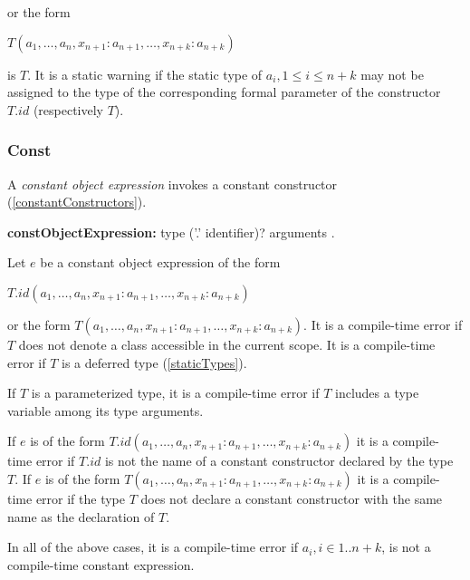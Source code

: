 \documentclass{article}
\begin{document}
or the form

\NEW{} $T(a_1, \ldots , a_n, x_{n+1}: a_{n+1}, \ldots , x_{n+k}: a_{n+k})$

is $T$.
It is a static warning if the static type of $a_i, 1 \le i \le n+ k$ may not be assigned to the type of the corresponding formal parameter of the constructor $T.id$ (respectively $T$).


\subsubsection{Const}

\LMHash{}
A {\em constant object expression} invokes a constant constructor (\ref{constantConstructors}).

\begin{grammar}
{\bf constObjectExpression:}\CONST{} type ('{\escapegrammar .}' identifier)? arguments
  .
\end{grammar}

\LMHash{}
Let $e$ be a constant object expression of the form

\CONST{} $T.id(a_1, \ldots , a_n, x_{n+1}: a_{n+1}, \ldots , x_{n+k}: a_{n+k})$

or the form \CONST{} $T(a_1, \ldots , a_n, x_{n+1}: a_{n+1}, \ldots , x_{n+k}: a_{n+k})$.
It is a compile-time error if $T$ does not denote a class accessible in the current scope.
It is a compile-time error if $T$ is a deferred type (\ref{staticTypes}).


\LMHash{}
If $T$ is a parameterized type, it is a compile-time error if $T$ includes a type variable among its type arguments.

\LMHash{}
If $e$ is of the form \CONST{} $T.id(a_1, \ldots , a_n, x_{n+1}: a_{n+1}, \ldots , x_{n+k}: a_{n+k})$ it is a compile-time error if $T.id$ is not the name of a constant constructor declared by the type $T$.
If $e$ is of the form \CONST{} $T(a_1, \ldots , a_n, x_{n+1}: a_{n+1}, \ldots , x_{n+k}: a_{n+k})$ it is a compile-time error if the type $T$ does not declare a constant constructor with the same name as the declaration of $T$.

\LMHash{}
In all of the above cases, it is a compile-time error if $a_i, i\in 1 .. n + k$, is not a compile-time constant expression.

\end{document}

